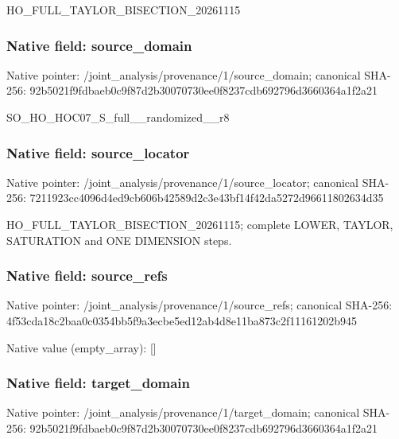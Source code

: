 \documentclass[10pt,a4paper]{article}
\begin{document}
\begingroup\raggedright\sloppy HO\_\allowbreak{}FULL\_\allowbreak{}TAYLOR\_\allowbreak{}BISECTION\_\allowbreak{}20261115\par\endgroup

\subsubsection{Native field: source\_\allowbreak{}domain}
Native pointer: /joint\_\allowbreak{}analysis/provenance/1/source\_\allowbreak{}domain; canonical SHA-256: 92b5021f9fdbaeb0c9f87d2b30070730ee0f8237cdb692796d3660364a1f2a21

\begingroup\raggedright\sloppy SO\_\allowbreak{}HO\_\allowbreak{}HOC07\_\allowbreak{}S\_\allowbreak{}full\_\allowbreak{}\_\allowbreak{}randomized\_\allowbreak{}\_\allowbreak{}r8\par\endgroup

\subsubsection{Native field: source\_\allowbreak{}locator}
Native pointer: /joint\_\allowbreak{}analysis/provenance/1/source\_\allowbreak{}locator; canonical SHA-256: 7211923cc4096d4ed9cb606b42589d2c3e43bf14f42da5272d96611802634d35

\begingroup\raggedright\sloppy HO\_\allowbreak{}FULL\_\allowbreak{}TAYLOR\_\allowbreak{}BISECTION\_\allowbreak{}20261115;\allowbreak{} complete LOWER,\allowbreak{} TAYLOR,\allowbreak{} SATURATION and ONE DIMENSION steps.\par\endgroup

\subsubsection{Native field: source\_\allowbreak{}refs}
Native pointer: /joint\_\allowbreak{}analysis/provenance/1/source\_\allowbreak{}refs; canonical SHA-256: 4f53cda18c2baa0c0354bb5f9a3ecbe5ed12ab4d8e11ba873c2f11161202b945

Native value (empty\_\allowbreak{}array): []

\subsubsection{Native field: target\_\allowbreak{}domain}
Native pointer: /joint\_\allowbreak{}analysis/provenance/1/target\_\allowbreak{}domain; canonical SHA-256: 92b5021f9fdbaeb0c9f87d2b30070730ee0f8237cdb692796d3660364a1f2a21
\end{document}
